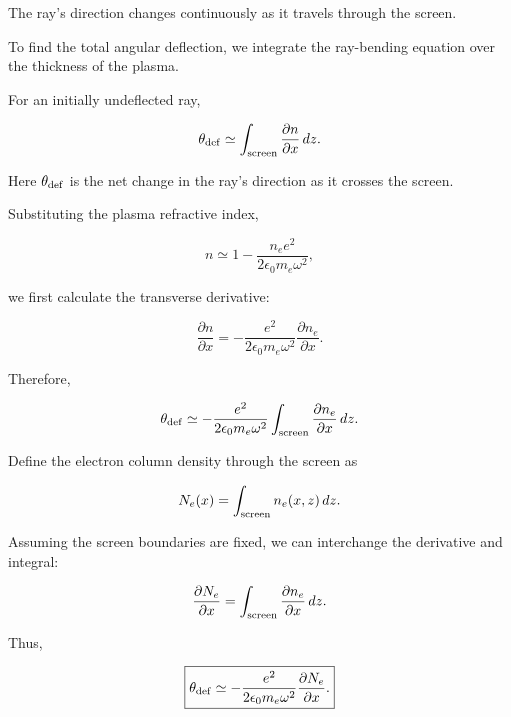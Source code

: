 The ray's direction changes continuously
as it travels through the screen.

To find the total angular deflection,
we integrate the ray-bending equation
over the thickness of the plasma.

For an initially undeflected ray,

\begin{equation}
\theta_{\rm def}
\simeq
\int_{\rm screen}
\frac{\partial n}{\partial x}\,dz.
\end{equation}

Here $\theta_{\rm def}$ is the net change in
the ray's direction as it crosses the screen.

Substituting the plasma refractive index,

\begin{equation}
n\simeq
1-\frac{n_e e^2}{2\epsilon_0m_e\omega^2},
\end{equation}

we first calculate the transverse derivative:

\begin{equation}
\frac{\partial n}{\partial x}
=
-\frac{e^2}{2\epsilon_0m_e\omega^2}
\frac{\partial n_e}{\partial x}.
\end{equation}

Therefore,

\begin{equation}
\theta_{\rm def}
\simeq
-\frac{e^2}{2\epsilon_0m_e\omega^2}
\int_{\rm screen}
\frac{\partial n_e}{\partial x}\,dz.
\end{equation}

Define the electron column density through
the screen as

\begin{equation}
N_e(x)=
\int_{\rm screen}n_e(x,z)\,dz.
\end{equation}

Assuming the screen boundaries are fixed,
we can interchange the derivative and integral:

\begin{equation}
\frac{\partial N_e}{\partial x}
=
\int_{\rm screen}
\frac{\partial n_e}{\partial x}\,dz.
\end{equation}

Thus,

\begin{equation}
\boxed{
\theta_{\rm def}\simeq
-\frac{e^2}{2\epsilon_0m_e\omega^2}
\frac{\partial N_e}{\partial x}.
}
\end{equation}

